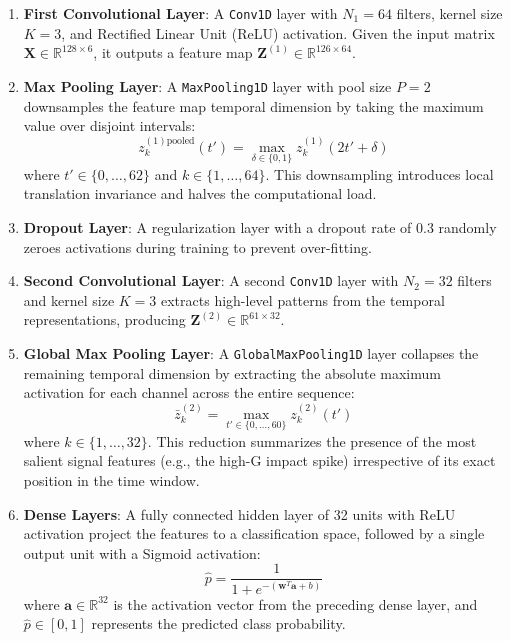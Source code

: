 \documentclass[journal]{IEEEtran}
\begin{document}
\begin{enumerate}
  \item \textbf{First Convolutional Layer}: A \texttt{Conv1D} layer with $N_1 = 64$ filters, kernel size $K = 3$, and Rectified Linear Unit (ReLU) activation. Given the input matrix $\mathbf{X} \in \mathbb{R}^{128 \times 6}$, it outputs a feature map $\mathbf{Z}^{(1)} \in \mathbb{R}^{126 \times 64}$.
  
  \item \textbf{Max Pooling Layer}: A \texttt{MaxPooling1D} layer with pool size $P = 2$ downsamples the feature map temporal dimension by taking the maximum value over disjoint intervals:
  \begin{equation}
    z^{(1)\text{pooled}}_k(t') = \max_{\delta \in \{0, 1\}} z^{(1)}_k(2t' + \delta)
    \label{eq:maxpool}
  \end{equation}
  where $t' \in \{0, \ldots, 62\}$ and $k \in \{1, \ldots, 64\}$. This downsampling introduces local translation invariance and halves the computational load.
  
  \item \textbf{Dropout Layer}: A regularization layer with a dropout rate of $0.3$ randomly zeroes activations during training to prevent over-fitting.
  
  \item \textbf{Second Convolutional Layer}: A second \texttt{Conv1D} layer with $N_2 = 32$ filters and kernel size $K = 3$ extracts high-level patterns from the temporal representations, producing $\mathbf{Z}^{(2)} \in \mathbb{R}^{61 \times 32}$.
  
  \item \textbf{Global Max Pooling Layer}: A \texttt{GlobalMaxPooling1D} layer collapses the remaining temporal dimension by extracting the absolute maximum activation for each channel across the entire sequence:
  \begin{equation}
    \bar{z}^{(2)}_k = \max_{t' \in \{0, \dots, 60\}} z^{(2)}_k(t')
    \label{eq:globalmax}
  \end{equation}
  where $k \in \{1, \ldots, 32\}$. This reduction summarizes the presence of the most salient signal features (e.g., the high-G impact spike) irrespective of its exact position in the time window.
  
  \item \textbf{Dense Layers}: A fully connected hidden layer of 32 units with ReLU activation project the features to a classification space, followed by a single output unit with a Sigmoid activation:
  \begin{equation}
    \hat{p} = \frac{1}{1 + e^{-\left(\mathbf{w}^T \mathbf{a} + b\right)}}
    \label{eq:dense}
  \end{equation}
  where $\mathbf{a} \in \mathbb{R}^{32}$ is the activation vector from the preceding dense layer, and $\hat{p} \in [0, 1]$ represents the predicted class probability.
\end{enumerate}
\end{document}
